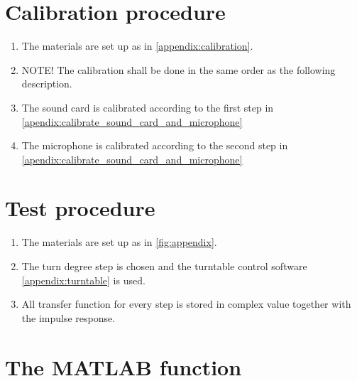 %

\section*{Calibration procedure}


\begin{enumerate}
\item The materials are set up as in \autoref{appendix:calibration}.
\item NOTE! The calibration shall be done in the same order as the following description.
\item The sound card is calibrated according to the first step in \autoref{apendix:calibrate_sound_card_and_microphone}   
\item The microphone is calibrated according to the second step in \autoref{apendix:calibrate_sound_card_and_microphone}
\end{enumerate}

\section*{Test procedure}


\begin{enumerate}
\item The materials are set up as in \autoref{fig:appendix}.
\item The turn degree step is chosen and the turntable control software \autoref{appendix:turntable} is used.  
\item  All transfer function for every step is stored in complex value together with the impulse response.
\end{enumerate}



\section*{The MATLAB function}


